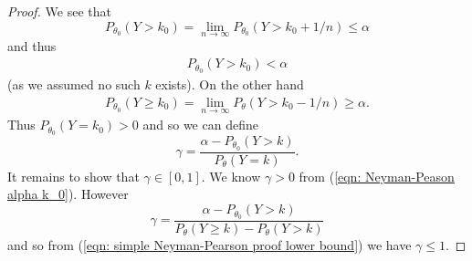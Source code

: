 \documentclass[twoside, a4paper, 10pt]{amsart}
\begin{document}
\begin{proof}
We see that $$P_{\theta_0}(Y > k_0) = \lim_{n \to \infty}P_{\theta_0}(Y > k_0 + 1/n) \leq \alpha$$ and thus 
\begin{align}\label{eqn: Neyman-Peason alpha k_0} P_{\theta_0}(Y>k_0) < \alpha \end{align} 
(as we assumed no such $k$ exists). On the other hand 
\begin{align}\label{eqn: simple Neyman-Pearson proof lower bound} P_{\theta_0}(Y \geq k_0) = \lim_{n \to \infty} P_{\theta}(Y>k_0 - 1/n) \geq \alpha. \end{align}
 Thus $P_{\theta_0}(Y = k_0) > 0$ and so we can define $$\gamma = \frac{\alpha - P_{\theta_0}(Y>k)}{P_{\theta}(Y=k)}.$$ It remains to show that $\gamma \in [0,1]$. We know $\gamma >0$ from (\ref{eqn: Neyman-Peason alpha k_0}). However $$\gamma = \frac{\alpha - P_{\theta_0}(Y>k)}{P_{\theta}(Y \geq k) - P_{\theta}(Y>k)}$$ and so from (\ref{eqn: simple Neyman-Pearson proof lower bound}) we have $\gamma \leq 1$. \end{proof}
\end{document}
